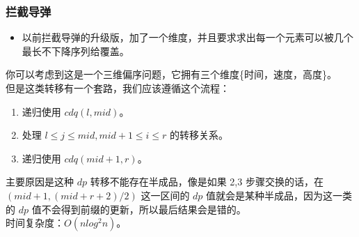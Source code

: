 \documentclass[a4paper,12pt]{article}
\begin{document}
\subsubsection{拦截导弹}

\begin{itemize}
\item
以前拦截导弹的升级版，加了一个维度，并且要求求出每一个元素可以被几个最长不下降序列给覆盖。
\end{itemize}

\noindent 你可以考虑到这是一个三维偏序问题，它拥有三个维度\{时间，速度，高度\}。
\\

\noindent 但是这类转移有一个套路，我们应该遵循这个流程：

\begin{enumerate}
\def\labelenumi{\arabic{enumi}.}
\item
  递归使用 \(cdq(l,mid)\)。
\item
  处理 \(l \leq j \leq mid,mid+1 \leq i \leq r\) 的转移关系。
\item
  递归使用 \(cdq(mid+1,r)\)。
\end{enumerate}

\noindent 主要原因是这种 \(dp\) 转移不能存在半成品，像是如果 2,3 步骤交换的话，在
\((mid+1,(mid+r+2)/2)\) 这一区间的 \(dp\)
值就会是某种半成品，因为这一类的 \(dp\)
值不会得到前缀的更新，所以最后结果会是错的。
\\

\noindent 时间复杂度：\(O(n log^2n)\)。
\end{document}
